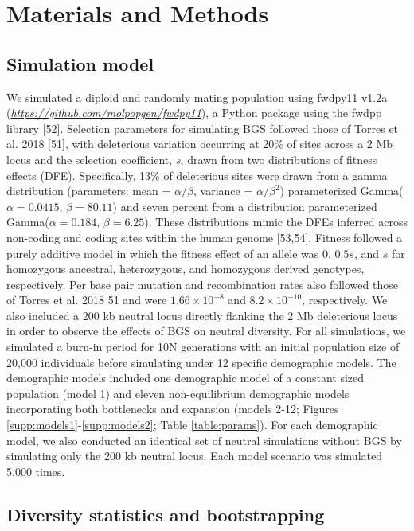 \documentclass[9pt,twocolumn,twoside]{rilabRxiv}
\begin{document}
\section{Materials and Methods}
\label{sec:materials:methods}

\subsection{Simulation model}

We simulated a diploid and randomly mating population using fwdpy11 v1.2a (\href{https://github.com/molpopgen/fwdpy11}{\emph{https://github.com/molpopgen/fwdpy11}}), a Python package using the fwdpp library [52].
Selection parameters for simulating BGS followed those of Torres et al. 2018 [51], with deleterious variation occurring at 20\% of sites across a 2 Mb locus and the selection coefficient, \textit{s}, drawn from two distributions of fitness effects (DFE).
Specifically, 13\% of deleterious sites were drawn from a gamma distribution (parameters: mean = $\alpha/\beta$, variance = $\alpha/\beta^2$) parameterized Gamma($\alpha = 0.0415$, $\beta = 80.11$) and seven percent from a distribution parameterized Gamma($\alpha = 0.184$, $\beta = 6.25$).
These distributions mimic the DFEs inferred across non-coding and coding sites within the human genome [53,54].
Fitness followed a purely additive model in which the fitness effect of an allele was 0, $0.5s$, and $s$ for homozygous ancestral, heterozygous, and homozygous derived genotypes, respectively.
Per base pair mutation and recombination rates also followed those of Torres et al. 2018 {51} and were $1.66 \times 10^{-8}$ and $8.2 \times 10^{-10}$, respectively.
We also included a 200 kb neutral locus directly flanking the 2 Mb deleterious locus in order to observe the effects of BGS on neutral diversity.
For all simulations, we simulated a burn-in period for 10N generations with an initial population size of 20,000 individuals before simulating under 12 specific demographic models.
The demographic models included one demographic model of a constant sized population (model 1) and eleven non-equilibrium demographic models incorporating both bottlenecks and expansion (models 2-12; Figures \ref{supp:models1}-\ref{supp:models2}; Table \ref{table:params}).
For each demographic model, we also conducted an identical set of neutral simulations without BGS by simulating only the 200 kb neutral locus.
Each model scenario was simulated 5,000 times.

\subsection{Diversity statistics and bootstrapping}
\end{document}
